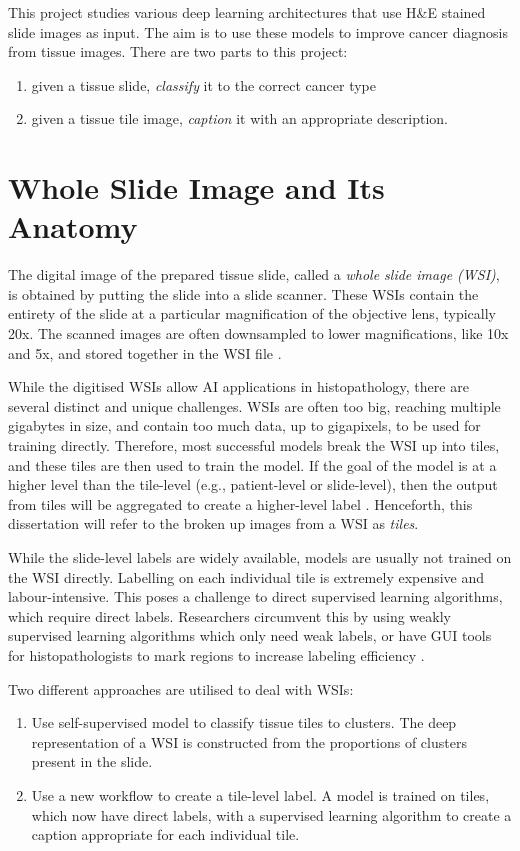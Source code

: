 \documentclass{l4proj}
\begin{document}
This project studies various deep learning architectures that use H\&E stained slide images as input. The aim is to use these models to improve cancer diagnosis from tissue images. There are two parts to this project:
\begin{enumerate}
    \item given a tissue slide, \emph{classify} it to the correct cancer type
    \item given a tissue tile image, \emph{caption} it with an appropriate description.
\end{enumerate}

\section{Whole Slide Image and Its Anatomy} \label{sec:WSI_anatomy}
The digital image of the prepared tissue slide, called a \emph{whole slide image (WSI)}, is obtained by putting the slide into a slide scanner. These WSIs contain the entirety of the slide at a particular magnification of the objective lens, typically 20x. The scanned images are often downsampled to lower magnifications, like 10x and 5x, and stored together in the WSI file \citep{Zarella2018}. 

While the digitised WSIs allow AI applications in histopathology, there are several distinct and unique challenges. WSIs are often too big, reaching multiple gigabytes in size, and contain too much data, up to gigapixels, to be used for training directly. Therefore, most successful models break the WSI up into tiles, and these tiles are then used to train the model. If the goal of the model is at a higher level than the tile-level (e.g., patient-level or slide-level), then the output from tiles will be aggregated to create a higher-level label \citep{Dimitriou2019}. Henceforth, this dissertation will refer to the broken up images from a WSI as \emph{tiles}. 

While the slide-level labels are widely available, models are usually not trained on the WSI directly. Labelling on each individual tile is extremely expensive and labour-intensive. This poses a challenge to direct supervised learning algorithms, which require direct labels. Researchers circumvent this by using weakly supervised learning algorithms which only need weak labels, or have GUI tools for histopathologists to mark regions to increase labeling efficiency \citep{komura2018}.

Two different approaches are utilised to deal with WSIs:
\begin{enumerate}
    \item Use self-supervised model to classify tissue tiles to clusters. The deep representation of a WSI is constructed from the proportions of clusters present in the slide.
    \item Use a new workflow to create a tile-level label. A model is trained on tiles, which now have direct labels, with a supervised learning algorithm to create a caption appropriate for each individual tile.
\end{enumerate}
\end{document}
